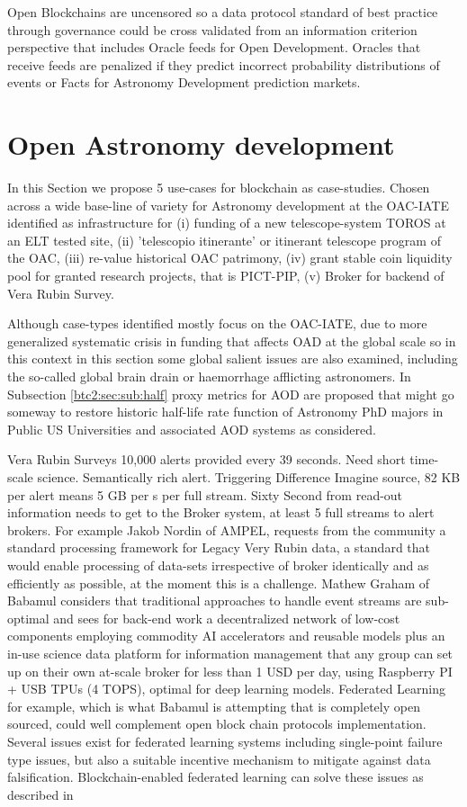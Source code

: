 \documentclass[final,5p,times,twocolumn,authoryear]{elsarticle}
\begin{document}
Open Blockchains are uncensored so a data protocol standard of best practice through governance could be cross validated from an information criterion perspective that includes Oracle feeds for Open Development.  Oracles that receive feeds are penalized if they predict incorrect probability distributions of events or Facts for Astronomy Development prediction markets. 

\section{Open Astronomy development}
\label{sec:btc2}

In this Section we propose 5 use-cases for blockchain as case-studies. Chosen across a wide base-line of variety for Astronomy development at the OAC-IATE identified as infrastructure for (i) funding of a new telescope-system TOROS at an ELT tested site, (ii) 'telescopio itinerante' or itinerant telescope program of the OAC, (iii) re-value historical OAC patrimony, (iv) grant stable coin liquidity pool for granted research projects, that is PICT-PIP, (v) Broker for backend of Vera Rubin Survey. 

Although case-types identified mostly focus on  the OAC-IATE, due to more generalized systematic crisis in funding that affects OAD at the global scale so in this context in this section some global salient issues are also examined, including the so-called global brain drain or haemorrhage afflicting astronomers. In Subsection \ref{btc2:sec:sub:half} proxy metrics for AOD are proposed that might go someway to restore historic half-life rate function of Astronomy PhD majors in Public US Universities and associated AOD systems as considered. 

Vera Rubin Surveys 10,000 alerts provided every 39 seconds. Need short time-scale science. Semantically rich alert. Triggering Difference Imagine source, 82 KB per alert means 5 GB per s per full stream. Sixty Second from read-out information needs to get to the Broker system, at least 5 full streams to alert brokers.   For example  Jakob Nordin of AMPEL, requests from the community a standard processing framework for Legacy Very Rubin data, a standard that would enable processing of data-sets irrespective of broker identically and as efficiently as possible, at the moment this is a challenge.  Mathew Graham of Babamul considers that traditional approaches to handle event streams are sub-optimal and sees for back-end work a decentralized network of low-cost components employing commodity AI accelerators and reusable models plus an in-use science data platform for information management that any group can set up on their own at-scale broker for less than 1 USD per day, using Raspberry PI + USB TPUs (4 TOPS), optimal for deep learning models.  Federated Learning for example, which is what Babamul is attempting that is completely open sourced, could well complement open block chain protocols implementation. Several issues exist for federated learning systems including single-point failure type issues, but also a suitable incentive mechanism to mitigate against data falsification. Blockchain-enabled federated learning can solve these issues as described in 
\end{document}
